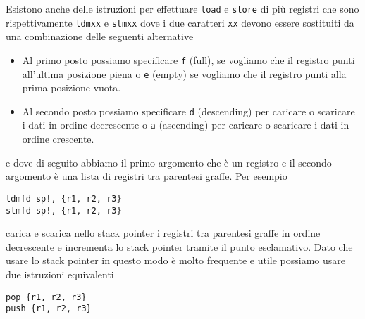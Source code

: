 Esistono anche delle istruzioni per effettuare \verb|load| e \verb|store| di più registri che sono
rispettivamente \verb|ldmxx| e \verb|stmxx| dove i due caratteri \verb|xx| devono essere sostituiti
da una combinazione delle seguenti alternative
\begin{itemize}
	\item Al primo posto possiamo specificare \verb|f| (full), se vogliamo che il registro punti
	      all'ultima posizione piena o \verb|e| (empty) se vogliamo che il registro punti alla
	      prima posizione vuota.
	\item Al secondo posto possiamo specificare \verb|d| (descending) per caricare o scaricare i
	      dati in ordine decrescente o \verb|a| (ascending) per caricare o scaricare i dati in
	      ordine crescente.
\end{itemize}
e dove di seguito abbiamo il primo argomento che è un registro e il secondo argomento è una lista
di registri tra parentesi graffe. Per esempio
\begin{verbatim}
ldmfd sp!, {r1, r2, r3}
stmfd sp!, {r1, r2, r3}
\end{verbatim}
carica e scarica nello stack pointer i registri tra parentesi graffe in ordine decrescente e
incrementa lo stack pointer tramite il punto esclamativo. Dato che usare lo stack pointer in questo
modo è molto frequente e utile possiamo usare due istruzioni equivalenti
\begin{verbatim}
pop {r1, r2, r3}
push {r1, r2, r3}
\end{verbatim}
